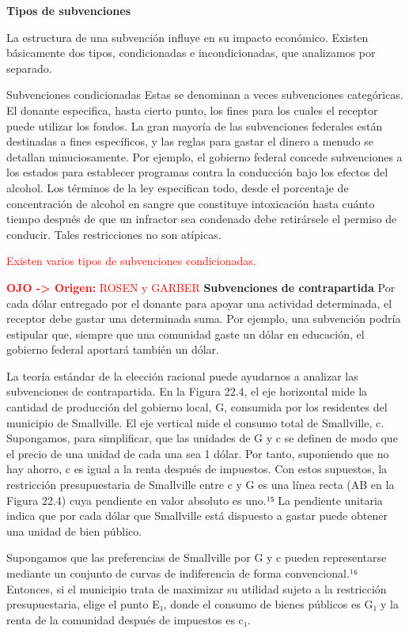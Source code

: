 \documentclass[10pt,a4paper]{article}
\begin{document}
\textbf{Tipos de subvenciones}

La estructura de una subvención influye en su impacto económico. Existen básicamente dos tipos, condicionadas e incondicionadas, que analizamos por separado.

Subvenciones condicionadas Estas se denominan a veces subvenciones categóricas. El donante especifica, hasta cierto punto, los fines para los cuales el receptor puede utilizar los fondos. La gran mayoría de las subvenciones federales están destinadas a fines específicos, y las reglas para gastar el dinero a menudo se detallan minuciosamente. Por ejemplo, el gobierno federal concede subvenciones a los estados para establecer programas contra la conducción bajo los efectos del alcohol. Los términos de la ley especifican todo, desde el porcentaje de concentración de alcohol en sangre que constituye intoxicación hasta cuánto tiempo después de que un infractor sea condenado debe retirársele el permiso de conducir. Tales restricciones no son atípicas.

\textcolor{red}{Existen varios tipos de subvenciones condicionadas.}

\textcolor{red}{\textbf{OJO -> Origen:} ROSEN y GARBER}
\textbf{Subvenciones de contrapartida }
Por cada dólar entregado por el donante para apoyar una actividad determinada, el receptor debe gastar una determinada suma. Por ejemplo, una subvención podría estipular que, siempre que una comunidad gaste un dólar en educación, el gobierno federal aportará también un dólar.

La teoría estándar de la elección racional puede ayudarnos a analizar las subvenciones de contrapartida. En la Figura 22.4, el eje horizontal mide la cantidad de producción del gobierno local, G, consumida por los residentes del municipio de Smallville. El eje vertical mide el consumo total de Smallville, c. Supongamos, para simplificar, que las unidades de G y c se definen de modo que el precio de una unidad de cada una sea 1 dólar. Por tanto, suponiendo que no hay ahorro, c es igual a la renta después de impuestos. Con estos supuestos, la restricción presupuestaria de Smallville entre c y G es una línea recta (AB en la Figura 22.4) cuya pendiente en valor absoluto es uno.¹⁵ La pendiente unitaria indica que por cada dólar que Smallville está dispuesto a gastar puede obtener una unidad de bien público.

Supongamos que las preferencias de Smallville por G y c pueden representarse mediante un conjunto de curvas de indiferencia de forma convencional.¹⁶ Entonces, si el municipio trata de maximizar su utilidad sujeto a la restricción presupuestaria, elige el punto E₁, donde el consumo de bienes públicos es G₁ y la renta de la comunidad después de impuestos es c₁.
\end{document}
